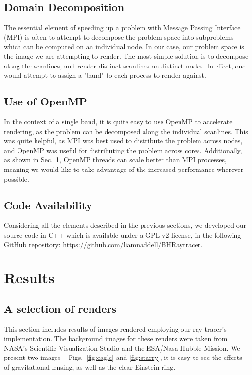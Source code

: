 \subsection{Domain Decomposition}

The essential element of speeding up a problem with Message Passing Interface (MPI) \cite{mpi41} is often to attempt to decompose the problem space into subproblems which can be computed on an individual node. In our case, our problem space is the image we are attempting to render. The most simple solution is to decompose along the scanlines, and render distinct scanlines on distinct nodes. In effect, one would attempt to assign a "band" to each process to render against.

\subsection{Use of OpenMP}
In the context of a single band, it is quite easy to use OpenMP \cite{660313_OMP} to accelerate rendering, as the problem can be decomposed along the individual scanlines. This was quite helpful, as MPI was best used to distribute the problem across nodes, and OpenMP was useful for distributing the problem across cores.
Additionally, as shown in Sec.~\ref{sec:results}, OpenMP threads can scale better than MPI processes, meaning we would like to take advantage of the increased performance wherever possible.

\subsection{Code Availability}
Considering all the elements described in the previous sections, we developed our
source code in C++ which is available under a GPL-v2 license, in the following
GitHub repository:
	\url{https://github.com/liamnaddell/BHRaytracer}.



\section{Results}
\label{sec:results}

\subsection{A selection of renders}

This section includes results of images rendered employing our ray tracer's implementation.
The background images for these renders were taken from NASA's Scientific Visualization Studio and the ESA/Nasa Hubble Mission.
We present two images -- Figs.~\ref{fig:eagle} and \ref{fig:starry}, it is easy to see the effects of gravitational lensing, as well as the clear Einstein ring. 

